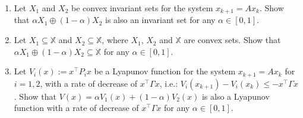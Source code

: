 \begin{enumerate}
    \item Let $X_1$ and $X_2$ be convex invariant sets for the system $x_{k+1} = Ax_k$. Show that $\alpha X_1\oplus (1-\alpha)X_2$ is also an invariant set for any $\alpha \in [0,1]$.

    \item Let $X_1\subseteq\mathbb{X}$ and $X_2\subseteq\mathbb{X}$, where $X_1$, $X_2$ and $\mathbb{X}$ are convex sets. Show that $\alpha X_1\oplus (1-\alpha)X_2\subseteq \mathbb{X}$ for any $\alpha \in [0,1]$.

    \item Let $V_i(x):= x^{\top}P_ix$ be a Lyapunov function for the system $x_{k+1} = Ax_k$ for $i = 1,2$, with a rate of decrease of $x^{\top}\Gamma x$, i.e.: $V_i(x_{k+1})-V_i(x_k)\leq -x^{\top}\Gamma x$. Show that $V(x) = \alpha V_1(x)+(1-\alpha)V_2(x)$ is also a Lyapunov function with a rate of decrease of $x^{\top}\Gamma x$ for any $\alpha \in [0,1]$.


\end{enumerate}
